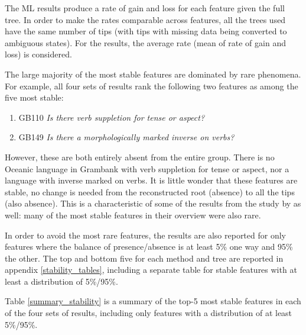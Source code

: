 \documentclass[draft,10pt]{article} %
\begin{document}
The ML results produce a rate of gain and loss for each feature given the full tree. In order to make the rates comparable across features, all the trees used have the same number of tips (with tips with missing data being converted to ambiguous states). For the results, the average rate (mean of rate of gain and loss) is considered.

The large majority of the most stable features are dominated by rare phenomena. For example, all four sets of results rank the following two features as among the five most stable:

\begin{enumerate}
    \item GB110 \emph{Is there verb suppletion for tense or aspect?}
    \item GB149 \emph{Is there a morphologically marked inverse on verbs?}
\end{enumerate}

However, these are both entirely absent from the entire group. There is no Oceanic language in Grambank with verb suppletion for tense or aspect, nor a language with inverse marked on verbs. It is little wonder that these features are stable, no change is needed from the reconstructed root (absence) to all the tips (also absence). This is a characteristic of some of the results from the study by \cite{dediu2013some} as well: many of the most stable features in their overview were also rare.

In order to avoid the most rare features, the results are also reported for only features where the balance of presence/absence is at least 5\% one way and 95\% the other. The top and bottom five for each method and tree are reported in appendix \ref{stability_tables}, including a separate table for stable features with at least a distribution of 5\%/95\%.

Table \ref{summary_stability} is a summary of the top-5 most stable features in each of the four sets of results, including only features with a distribution of at least 5\%/95\%.
\end{document}
